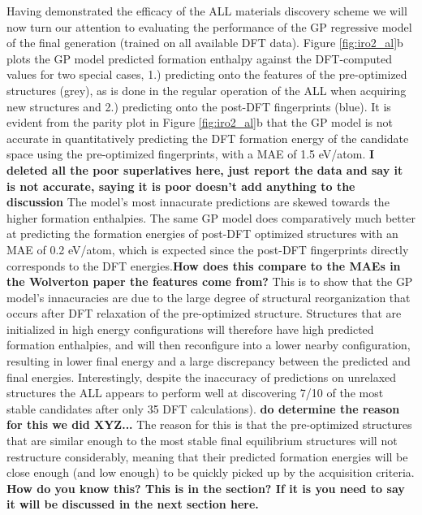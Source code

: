Having demonstrated the efficacy of the ALL materials discovery scheme we will now turn our attention to evaluating the performance of the GP regressive model of the final generation (trained on all available \IrOthree DFT data).
%
Figure \ref{fig:iro2_al}b plots the GP model predicted formation enthalpy against the DFT-computed values for two special cases,
1.) predicting onto the features of the pre-optimized structures (grey), as is done in the regular operation of the ALL when acquiring new structures and
2.) predicting onto the post-DFT fingerprints (blue).
%
It is evident from the parity plot in Figure \ref{fig:iro2_al}b that the GP model is not accurate in quantitatively predicting the DFT formation energy of the candidate space using the pre-optimized fingerprints,
with a MAE of \mytilde\num{1.5} eV/atom. \textbf{I deleted all the poor superlatives here, just report the data and say it is not accurate, saying it is poor doesn't add anything to the discussion}
%
The model's most innacurate predictions are skewed towards the higher formation enthalpies.
%
The same GP model does comparatively much better at predicting the formation energies of post-DFT optimized structures with an MAE of \mytilde\num{0.2} eV/atom,
which is expected since the post-DFT fingerprints directly corresponds to the DFT energies.\textbf{How does this compare to the MAEs in the Wolverton paper the features come from?}
%
This is to show that the GP model's innacuracies are due to the large degree of structural reorganization that occurs after DFT relaxation of the pre-optimized structure.
%
Structures that are initialized in high energy configurations will therefore have high predicted formation enthalpies, and will then reconfigure into a lower nearby configuration, resulting in lower final energy and a large discrepancy between the predicted and final energies.
%
Interestingly, despite the inaccuracy of predictions on unrelaxed structures the ALL appears to perform well at discovering \num{7/10} of the most stable candidates after only \num{35} DFT calculations). \textbf{do determine the reason for this we did XYZ...}
%
The reason for this is that the pre-optimized structures that are similar enough to the most stable final equilibrium structures will not restructure considerably, meaning that their predicted formation energies will be close enough (and low enough) to be quickly picked up by the acquisition criteria. \textbf{How do you know this?  This is in the section?  If it is you need to say it will be discussed in the next section here.}
%


